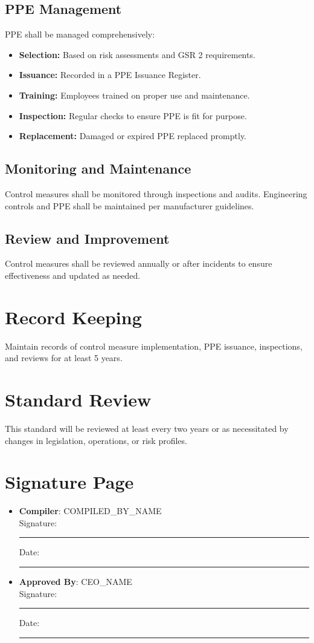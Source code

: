 \documentclass[11pt]{article}
\newcommand{\compilerName}{{{COMPILED_BY_NAME}}}
\begin{document}
\begin{itemize}
\subsection{PPE Management}
PPE shall be managed comprehensively:
\begin{itemize}
    \item \textbf{Selection:} Based on risk assessments and GSR 2 requirements.
    \item \textbf{Issuance:} Recorded in a PPE Issuance Register.
    \item \textbf{Training:} Employees trained on proper use and maintenance.
    \item \textbf{Inspection:} Regular checks to ensure PPE is fit for purpose.
    \item \textbf{Replacement:} Damaged or expired PPE replaced promptly.
\end{itemize}

\subsection{Monitoring and Maintenance}
Control measures shall be monitored through inspections and audits. Engineering controls and PPE shall be maintained per manufacturer guidelines.

\subsection{Review and Improvement}
Control measures shall be reviewed annually or after incidents to ensure effectiveness and updated as needed.

\section{Record Keeping}
Maintain records of control measure implementation, PPE issuance, inspections, and reviews for at least 5 years.

\section{Standard Review}
This standard will be reviewed at least every two years or as necessitated by changes in legislation, operations, or risk profiles.

\section{Signature Page}
\begin{itemize}
  \item \textbf{Compiler}: \compilerName \\
    Signature: \rule{5cm}{0.4pt} \quad Date: \rule{3cm}{0.4pt}
  \item \textbf{Approved By}: {{CEO_NAME}} \\
    Signature: \rule{5cm}{0.4pt} \quad Date: \rule{3cm}{0.4pt}
\end{itemize}


\end{itemize}
\end{document}
